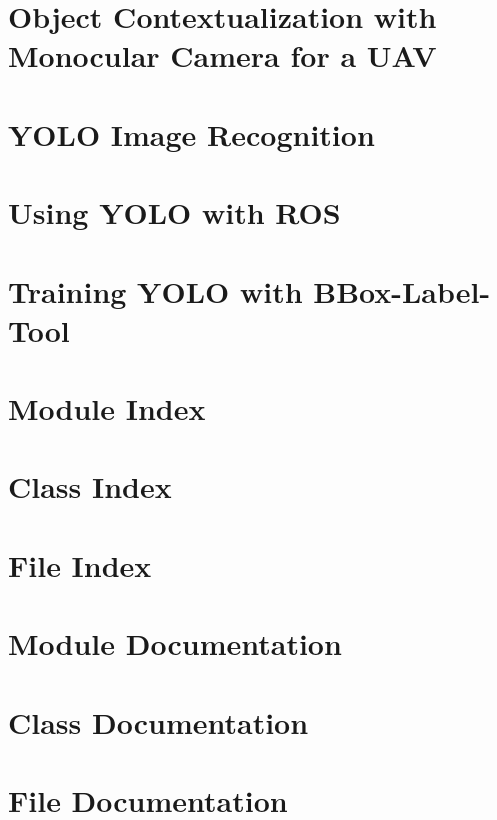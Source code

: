 \let\mypdfximage\pdfximage\def\pdfximage{\immediate\mypdfximage}\documentclass[twoside]{book}
\newcommand{\+}{\discretionary{\mbox{\scriptsize$\hookleftarrow$}}{}{}}
\newcommand{\clearemptydoublepage}{%
  \newpage{\pagestyle{empty}\cleardoublepage}%
}
\begin{document}
\chapter{Object Contextualization with Monocular Camera for a U\+AV}
\label{md_monocular_uav}

\chapter{Y\+O\+LO Image Recognition}
\label{md_yolo}

\chapter{Using Y\+O\+LO with R\+OS}
\label{md_yolo_ros}

\chapter{Training Y\+O\+LO with B\+Box-\/\+Label-\/\+Tool}
\label{md_yoloTraining}

\chapter{Module Index}

\chapter{Class Index}

\chapter{File Index}

\chapter{Module Documentation}

\chapter{Class Documentation}

\chapter{File Documentation}

















\backmatter
\newpage
{}
\clearemptydoublepage
{}
\printindex
\end{document}
